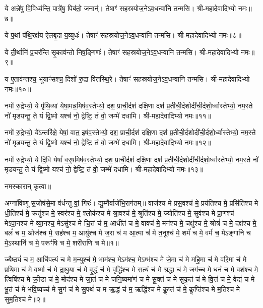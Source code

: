 ये अन्ने॑षु वि॒विध्य॑न्ति॒ पात्रे॑षु॒ पिब॑तो॒ जनान्॑। तेषाꣳ॑ सहस्रयोज॒ने\-ऽव॒धन्वा॑नि तन्मसि। श्री-महादेवादिभ्यो नमः॥७॥

ये प॒थां प॑थि॒रक्ष॑य ऐलबृ॒दा य॒व्युधः॑। तेषाꣳ॑ सहस्रयोज॒ने\-ऽव॒धन्वा॑नि तन्मसि। श्री-महादेवादिभ्यो नमः॥८॥

ये ती॒र्थानि॑ प्र॒चर॑न्ति सृ॒काव॑न्तो निष॒ङ्गिणः॑। तेषाꣳ॑ सहस्रयोज॒ने\-ऽव॒धन्वा॑नि तन्मसि। श्री-महादेवादिभ्यो नमः॥९॥

य ए॒ताव॑न्तश्च॒ भूयाꣳ॑सश्च॒ दिशो॑ रु॒द्रा वि॑तस्थि॒रे। तेषाꣳ॑ सहस्रयोज॒ने\-ऽव॒धन्वा॑नि तन्मसि। श्री-महादेवादिभ्यो नमः॥१०॥

नमो॑ रु॒द्रेभ्यो॒ ये पृ॑थि॒व्यां येषा॒मन्न॒मिष॑व॒स्तेभ्यो॒ दश॒ प्राची॒र्दश॑ दक्षि॒णा दश॑ प्र॒तीची॒र्दशो\-दी॑ची॒र्दशो॒र्ध्वास्तेभ्यो॒ नम॒स्ते नो॑ मृडयन्तु॒ ते यं द्वि॒ष्मो यश्च॑ नो॒ द्वेष्टि॒ तं वो॒ जम्भे॑ दधामि। श्री-महादेवादिभ्यो नमः॥११॥

नमो॑ रु॒द्रेभ्यो॒ ये᳚ऽन्तरि॑क्षे॒ येषां॒ वात॒ इष॑व॒स्तेभ्यो॒ दश॒ प्राची॒र्दश॑ दक्षि॒णा दश॑ प्र॒तीची॒र्दशो\-दी॑ची॒र्दशो॒र्ध्वास्तेभ्यो॒ नम॒स्ते नो॑ मृडयन्तु॒ ते यं द्वि॒ष्मो यश्च॑ नो॒ द्वेष्टि॒ तं वो॒ जम्भे॑ दधामि। श्री-महादेवादिभ्यो नमः॥१२॥

नमो॑ रु॒द्रेभ्यो॒ ये दि॒वि येषां᳚ व॒र्॒‌षमिष॑व॒स्तेभ्यो॒ दश॒ प्राची॒र्दश॑ दक्षि॒णा दश॑ प्र॒तीची॒र्दशो\-दी॑ची॒र्दशो॒र्ध्वास्तेभ्यो॒ नम॒स्ते नो॑ मृडयन्तु॒ ते यं द्वि॒ष्मो यश्च॑ नो॒ द्वेष्टि॒ तं वो॒ जम्भे॑ दधामि। श्री-महादेवादिभ्यो नमः॥१३॥

नमस्कारान् कृत्वा॥

{\small\closesection}


अग्ना॑विष्णू स॒जोष॑से॒मा व॑र्धन्तु वां॒ गिरः॑। द्यु॒म्नैर्वाजे॑भि॒रा\-ग॑तम्॥
वाज॑श्च मे प्रस॒वश्च॑ मे॒ प्रय॑तिश्च मे॒ प्रसि॑तिश्च मे धी॒तिश्च॑ मे॒ क्रतु॑श्च मे॒ स्वर॑श्च मे॒ श्लोक॑श्च मे श्रा॒वश्च॑ मे॒ श्रुति॑श्च मे॒ ज्योति॑श्च मे॒ सुव॑श्च मे प्रा॒णश्च॑ मेऽपा॒नश्च॑ मे व्या॒नश्च॒ मेऽसु॑श्च मे चि॒त्तं च॑ म॒ आधी॑तं च मे॒ वाक्च॑ मे॒ मन॑श्च मे॒ चक्षु॑श्च मे॒ श्रोत्रं॑ च मे॒ दक्ष॑श्च मे॒ बलं॑ च म॒ ओज॑श्च मे॒ सह॑श्च म॒ आयु॑श्च मे ज॒रा च॑ म आ॒त्मा च॑ मे त॒नूश्च॑ मे॒ शर्म॑ च मे॒ वर्म॑ च॒ मेऽङ्गा॑नि च मे॒ऽस्थानि॑ च मे॒ परूꣳ॑षि च मे॒ शरी॑राणि च मे॥१॥

ज्यैष्ठ्यं॑ च म॒ आधि॑पत्यं च मे म॒न्युश्च॑ मे॒ भाम॑श्च॒ मेऽम॑श्च॒ मेऽम्भ॑श्च मे जे॒मा च॑ मे महि॒मा च॑ मे वरि॒मा च॑ मे प्रथि॒मा च॑ मे व॒र्ष्मा च॑ मे द्राघु॒या च॑ मे वृ॒द्धं च॑ मे॒ वृद्धि॑श्च मे स॒त्यं च॑ मे श्र॒द्धा च॑ मे॒ जग॑च्च मे॒ धनं॑ च मे॒ वश॑श्च मे॒ त्विषि॑श्च मे क्री॒डा च॑ मे॒ मोद॑श्च मे जा॒तं च॑ मे जनि॒ष्यमा॑णं च मे सू॒क्तं च॑ मे सुकृ॒तं च॑ मे वि॒त्तं च॑ मे॒ वेद्यं॑ च मे भू॒तं च॑ मे भवि॒ष्यच्च॑ मे सु॒गं च॑ मे सु॒पथं॑ च म ऋ॒द्धं च॑ म॒ ऋद्धि॑श्च मे कॢ॒प्तं च॑ मे॒ कॢप्ति॑श्च मे म॒तिश्च॑ मे सुम॒तिश्च॑ मे॥२॥

